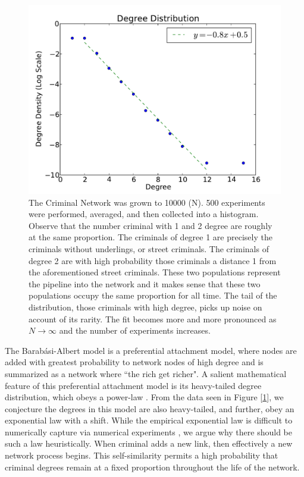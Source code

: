 \documentclass[11pt]{article}
\theoremstyle{plain}
\theoremstyle{definition}
\begin{document}
\begin{figure}
\centering
\includegraphics[width=.75\linewidth]{DegDist.pdf}
\caption{The Criminal Network was grown to 10000 (N).  500 experiments were performed, averaged, and then collected into a histogram. Observe that the number criminal with 1 and 2 degree are roughly at the same proportion.  The criminals of degree 1 are precisely the criminals without underlings, or street criminals.  The criminals of degree 2 are with high probability those criminals a distance 1 from the aforementioned street criminals.  These two populations represent the pipeline into the network and it makes sense that these two populations occupy the same proportion for all time.  The tail of the distribution, those criminals with high degree, picks up noise on account of its rarity.  The fit becomes more and more pronounced as $N \to \infty$ and the number of experiments increases.}
\label{DD}
\end{figure}

The Barab\'{a}si-Albert model is a preferential attachment model, where nodes are added with greatest probability to network nodes of high degree \cite{bollscalefree, BA1} and is summarized as a network where ``the rich get richer".  A salient mathematical feature of this preferential attachment model is its heavy-tailed degree distribution, which obeys a power-law \cite{bollscalefree}.  From the data seen in Figure [\ref{DD}], we conjecture the degrees in this model are also heavy-tailed, and further, obey an exponential law with a shift.  While the empirical exponential law is difficult to numerically capture via numerical experiments \cite{powerlawempi}, we argue why there should be such a law heuristically.  When criminal adds a new link, then effectively a new network process begins.  This self-similarity permits a high probability that criminal degrees remain at a fixed proportion throughout the life of the network.
\end{document}
